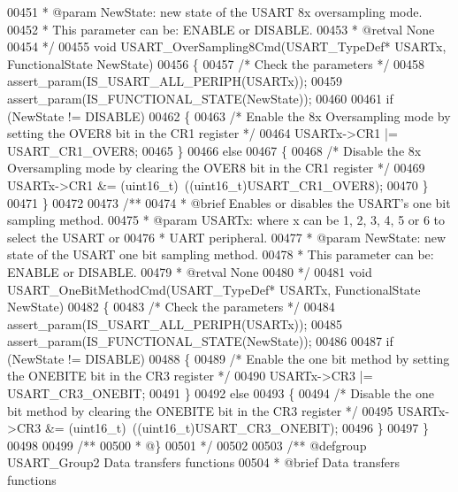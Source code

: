 \begin{DoxyCode}
00451 \textcolor{comment}{  * @param  NewState: new state of the USART 8x oversampling mode.}
00452 \textcolor{comment}{  *          This parameter can be: ENABLE or DISABLE.}
00453 \textcolor{comment}{  * @retval None}
00454 \textcolor{comment}{  */}
00455 \textcolor{keywordtype}{void} USART_OverSampling8Cmd(USART\_TypeDef* USARTx, FunctionalState NewState)
00456 \{
00457   \textcolor{comment}{/* Check the parameters */}
00458   assert_param(IS\_USART\_ALL\_PERIPH(USARTx));
00459   assert_param(IS\_FUNCTIONAL\_STATE(NewState));
00460 
00461   \textcolor{keywordflow}{if} (NewState != DISABLE)
00462   \{
00463     \textcolor{comment}{/* Enable the 8x Oversampling mode by setting the OVER8 bit in the CR1 register */}
00464     USARTx->CR1 |= USART_CR1_OVER8;
00465   \}
00466   \textcolor{keywordflow}{else}
00467   \{
00468     \textcolor{comment}{/* Disable the 8x Oversampling mode by clearing the OVER8 bit in the CR1 register */}
00469     USARTx->CR1 &= (uint16\_t)~((uint16\_t)USART_CR1_OVER8);
00470   \}
00471 \}
00472 
00473 \textcolor{comment}{/**}
00474 \textcolor{comment}{  * @brief  Enables or disables the USART's one bit sampling method.}
00475 \textcolor{comment}{  * @param  USARTx: where x can be 1, 2, 3, 4, 5 or 6 to select the USART or }
00476 \textcolor{comment}{  *         UART peripheral.}
00477 \textcolor{comment}{  * @param  NewState: new state of the USART one bit sampling method.}
00478 \textcolor{comment}{  *          This parameter can be: ENABLE or DISABLE.}
00479 \textcolor{comment}{  * @retval None}
00480 \textcolor{comment}{  */}
00481 \textcolor{keywordtype}{void} USART_OneBitMethodCmd(USART\_TypeDef* USARTx, FunctionalState NewState)
00482 \{
00483   \textcolor{comment}{/* Check the parameters */}
00484   assert_param(IS\_USART\_ALL\_PERIPH(USARTx));
00485   assert_param(IS\_FUNCTIONAL\_STATE(NewState));
00486 
00487   \textcolor{keywordflow}{if} (NewState != DISABLE)
00488   \{
00489     \textcolor{comment}{/* Enable the one bit method by setting the ONEBITE bit in the CR3 register */}
00490     USARTx->CR3 |= USART_CR3_ONEBIT;
00491   \}
00492   \textcolor{keywordflow}{else}
00493   \{
00494     \textcolor{comment}{/* Disable the one bit method by clearing the ONEBITE bit in the CR3 register */}
00495     USARTx->CR3 &= (uint16\_t)~((uint16\_t)USART_CR3_ONEBIT);
00496   \}
00497 \}
00498 
00499 \textcolor{comment}{/**}
00500 \textcolor{comment}{  * @\}}
00501 \textcolor{comment}{  */}
00502 
00503 \textcolor{comment}{/** @defgroup USART\_Group2 Data transfers functions}
00504 \textcolor{comment}{ *  @brief   Data transfers functions }

\end{DoxyCode}
